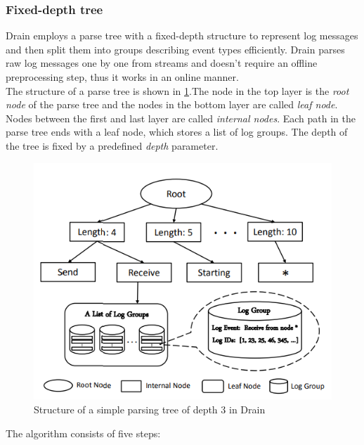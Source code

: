     \subsubsection*{Fixed-depth tree}\label{fixed_depth_tree}
    Drain \cite{drain2017} employs a parse tree with a fixed-depth structure to represent log messages and then split them into groups describing event types efficiently. Drain parses raw log messages one by one from streams and doesn't require an offline preprocessing step, thus it works in an online manner.\\
    The structure of a parse tree is shown in \ref{parseTreeDrain}.The node in the top layer is the \textit{root node} of the parse tree and the nodes in the bottom layer are called \textit{leaf node}. Nodes between the first and last layer are called \textit{internal nodes}. 
    Each path in the parse tree ends with a leaf node, which stores a list of log groups. The depth of the tree is fixed by a predefined \textit{depth} parameter. 
    
        \begin{figure}[htbp]
            \centerline{\includegraphics[scale=.5]{img/parse-tree-drain.PNG}}
            \caption{Structure of a simple parsing tree of depth $3$ in Drain \cite{drain2017}}
            \label{parseTreeDrain}
        \end{figure}
        
    The algorithm consists of five steps: 
    
